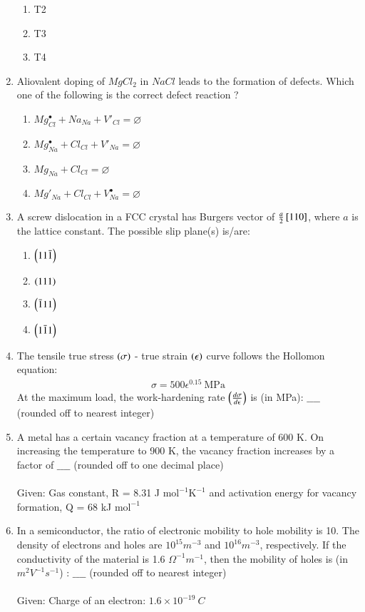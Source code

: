 \documentclass[journal]{IEEEtran}
\begin{document}
\begin{enumerate}
\begin{enumerate}
    \item T2
    \item T3
    \item T4 \\
\end{enumerate}
\item Aliovalent doping of $MgCl_2$ in $NaCl$ leads to the formation of defects. Which one of the following is the correct defect reaction ?
\begin{enumerate}
    \item $Mg^{\bullet}_{Cl} + Na_{Na} + V'_{Cl} = \varnothing$
    \item $Mg^{\bullet}_{Na} + Cl_{Cl} + V'_{Na} = \varnothing$
    \item $Mg_{Na} + Cl_{Cl} = \varnothing$
    \item $Mg'_{Na} + Cl_{Cl} + V^{\bullet}_{Na} = \varnothing$ \\
\end{enumerate}
\item A screw dislocation in a FCC crystal has Burgers vector of $\frac{a}{2}{}\left[1 1 0\right]$, where $a$ is the lattice constant. The possible slip plane(s) is/are:
\begin{enumerate}
    \item $\left(1 1 \bar{1}\right)$
    \item $\left(1 1 1\right)$
    \item $\left(\bar{1} 1 1\right)$
    \item $\left(1 \bar{1} 1\right)$ \\
\end{enumerate}
\item The tensile true stress $\left(\sigma\right)$ - true strain $\left(\epsilon\right)$ curve follows the Hollomon equation:
\begin{align*}
    \sigma = 500\epsilon^{0.15}\ \text{MPa}
\end{align*}
At the maximum load, the work-hardening rate $\left(\frac{d\sigma}{d\epsilon}\right)$ is (in MPa): $\_\_\_\_$ (rounded off to nearest integer) \\
\item A metal has a certain vacancy fraction at a temperature of 600 K. On increasing the temperature to 900 K, the vacancy fraction increases by a factor of $\_\_\_\_$ (rounded off to one decimal place) \\\\
Given: Gas constant, R = 8.31 J $\text{mol}^{-1}\text{K}^{-1}$ and activation energy for vacancy formation, Q = 68 kJ $\text{mol}^{-1}$ \\
\item In a semiconductor, the ratio of electronic mobility to hole mobility is 10. The density of electrons and holes are $10^{15} m^{-3}$ and $10^{16} m^{-3}$, respectively. If the conductivity of the material is 1.6 $\Omega^{-1} m^{-1}$, then the mobility of holes is (in $m^2V^{-1}s^{-1}$) : $\_\_\_\_$ (rounded off to nearest integer) \\\\
Given: Charge of an electron: $1.6 \times 10^{-19}\ C$ \\
			 \end{enumerate}
			 
\end{document}
